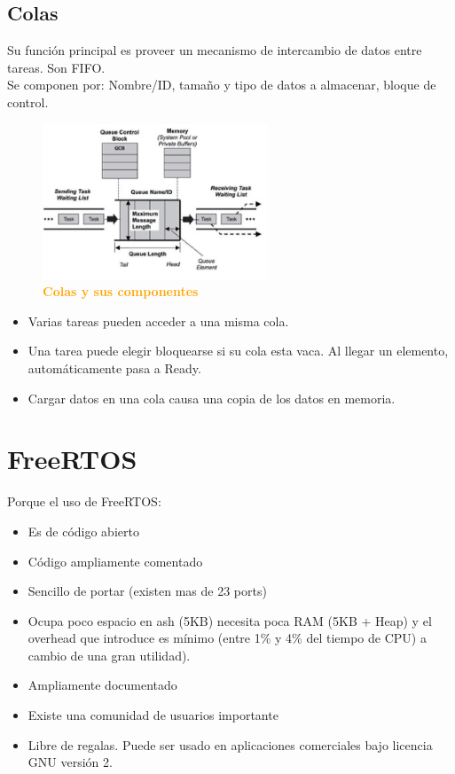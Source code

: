 \documentclass{article}
\begin{document}
\subsection{Colas}
Su función principal es proveer un mecanismo de intercambio de datos entre tareas. Son FIFO.\\
Se componen por: Nombre/ID, tamaño y tipo de datos a almacenar, bloque de control. \\

\begin{figure}[H]
   \centering
   \includegraphics[width=0.6\textwidth]{figures/queue1.jpg}
   \centering
   \caption{\textbf{\textcolor{Orange}{Colas y sus componentes}}}
\end{figure}

\clearpage
\begin{itemize}
\item Varias tareas pueden acceder a una misma cola.
\item Una tarea puede elegir bloquearse si su cola esta vaca. Al llegar un elemento, automáticamente pasa a Ready.
\item Cargar datos en una cola causa una copia de los datos en memoria.
\end{itemize}

\section{FreeRTOS}

Porque el uso de FreeRTOS:\\
\begin{itemize}
\item Es de código abierto
\item Código ampliamente comentado 
\item Sencillo de portar (existen mas de 23 ports)
\item Ocupa poco espacio en  ash (5KB) necesita poca RAM (5KB + Heap) y el overhead que introduce es mínimo (entre 1\% y 4\% del tiempo de CPU) a cambio de una gran utilidad).
\item Ampliamente documentado
\item  Existe una comunidad de usuarios importante 
\item Libre de regalas. Puede ser usado en aplicaciones comerciales bajo licencia GNU versión 2.
\end{itemize}
\end{document}
